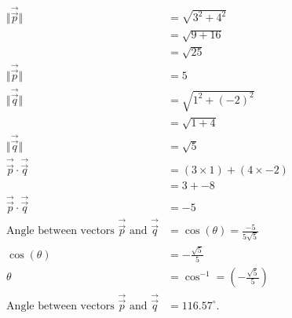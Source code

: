 \begin{solution}
  \begin{align*}
    \Vert \overrightarrow{\vec{p}} \Vert &= \sqrt{3^{2} + 4^{2}} \\
                                         &= \sqrt{9 + 16} \\
                                         &= \sqrt{25} \\
    \Vert \overrightarrow{\vec{p}} \Vert &= 5 \\
    \Vert \overrightarrow{\vec{q}} \Vert &= \sqrt{1^{2} + (-2)^{2}} \\
                                         &= \sqrt{1 + 4} \\
    \Vert \overrightarrow{\vec{q}} \Vert &= \sqrt{5} \\
    \overrightarrow{\vec{p}} \cdot \overrightarrow{\vec{q}} &= (3 \times 1) + (4 \times -2) \\
                                                            &= 3 + -8 \\
    \overrightarrow{\vec{p}} \cdot \overrightarrow{\vec{q}} &= -5 \\
    \textrm{Angle between vectors } \overrightarrow{\vec{p}} \textrm{ and } \overrightarrow{\vec{q}} &= \cos (\theta) = \frac{-5}{5 \sqrt{5}} \\
                                                                                       \cos (\theta) &= -\frac{\sqrt{5}}{5} \\
                                                                                              \theta &= \cos^{-1} = \left(-\frac{\sqrt{5}}{5}\right) \\
    \textrm{Angle between vectors } \overrightarrow{\vec{p}} \textrm{ and } \overrightarrow{\vec{q}} &= 116.57^{\circ}
  .\end{align*}
\end{solution}
